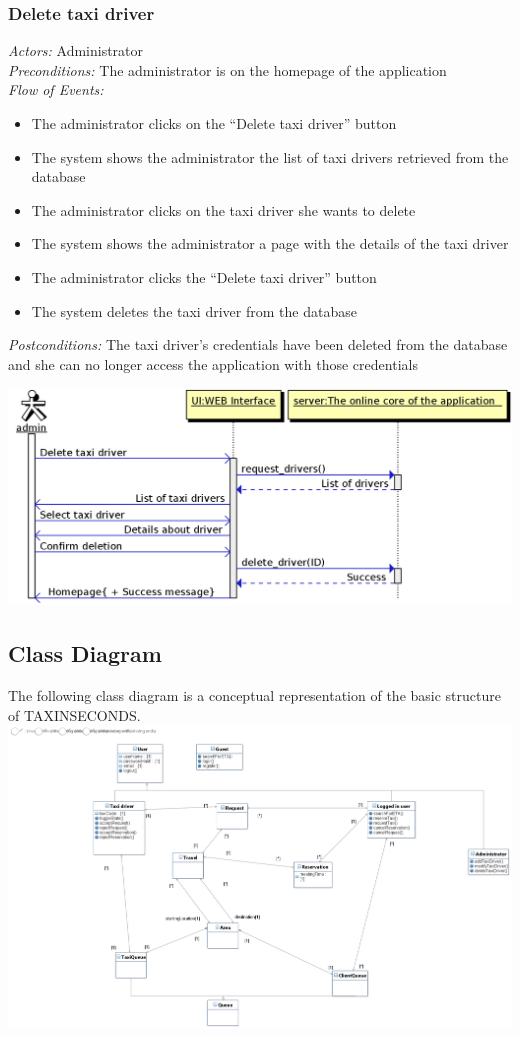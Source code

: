 \documentclass{article}
\begin{document}
\subsubsection{Delete taxi driver}
\textit{Actors:} Administrator
\\\textit{Preconditions:} The administrator is on the homepage of the application
\\\textit{Flow of Events:}
\begin{itemize}
	\item  The administrator clicks on the ``Delete taxi driver'' button
	\item  The system shows the administrator the list of taxi drivers retrieved from the database
	\item  The administrator clicks on the taxi driver she wants to delete
	\item  The system shows the administrator a page with the details of the taxi driver
	\item  The administrator clicks the ``Delete taxi driver'' button
	\item  The system deletes the taxi driver from the database
\end{itemize}
\textit{Postconditions:} The taxi driver's credentials have been deleted from the database and she can no longer access the application with those credentials
\begin{center}	
	\includegraphics[width=\textwidth,keepaspectratio]{Sequence-Diagrams/delete-taxi-driver}
\end{center}
\clearpage
\subsection{Class Diagram}
The following class diagram is a conceptual representation of the basic structure of TAXINSECONDS.
\includegraphics[width=.8\textwidth,height=.8\textheight,keepaspectratio]{ClassDiagram}
\end{document}
